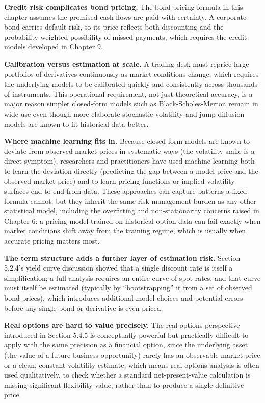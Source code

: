 \documentclass[../ai_in_finance]{subfiles}
\begin{document}
\textbf{Credit risk complicates bond pricing.} The bond pricing formula in this chapter assumes the promised cash flows are paid with certainty. A corporate bond carries default risk, so its price reflects both discounting and the probability-weighted possibility of missed payments, which requires the credit models developed in Chapter 9.

\textbf{Calibration versus estimation at scale.} A trading desk must reprice large portfolios of derivatives continuously as market conditions change, which requires the underlying models to be calibrated quickly and consistently across thousands of instruments. This operational requirement, not just theoretical accuracy, is a major reason simpler closed-form models such as Black-Scholes-Merton remain in wide use even though more elaborate stochastic volatility and jump-diffusion models are known to fit historical data better.

\textbf{Where machine learning fits in.} Because closed-form models are known to deviate from observed market prices in systematic ways (the volatility smile is a direct symptom), researchers and practitioners have used machine learning both to learn the deviation directly (predicting the gap between a model price and the observed market price) and to learn pricing functions or implied volatility surfaces end to end from data. These approaches can capture patterns a fixed formula cannot, but they inherit the same risk-management burden as any other statistical model, including the overfitting and non-stationarity concerns raised in Chapter 6: a pricing model trained on historical option data can fail exactly when market conditions shift away from the training regime, which is usually when accurate pricing matters most.

\textbf{The term structure adds a further layer of estimation risk.} Section 5.2.4's yield curve discussion showed that a single discount rate is itself a simplification; a full analysis requires an entire curve of spot rates, and that curve must itself be estimated (typically by ``bootstrapping'' it from a set of observed bond prices), which introduces additional model choices and potential errors before any single bond or derivative is even priced.

\textbf{Real options are hard to value precisely.} The real options perspective introduced in Section 5.4.5 is conceptually powerful but practically difficult to apply with the same precision as a financial option, since the underlying asset (the value of a future business opportunity) rarely has an observable market price or a clean, constant volatility estimate, which means real options analysis is often used qualitatively, to check whether a standard net-present-value calculation is missing significant flexibility value, rather than to produce a single definitive price.
\end{document}
